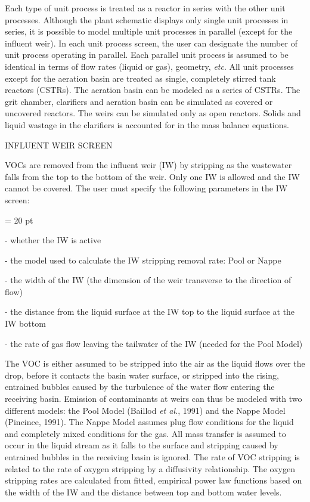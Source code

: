 Each type of unit process is treated as a reactor in series with the other unit
processes.  Although the plant schematic displays only single unit processes in
series, it is possible to model multiple unit processes in parallel (except for
the influent weir).  In each unit process screen, the user can designate the
number of unit process operating in parallel.  Each parallel unit process is
assumed to be identical in terms of flow rates (liquid or gas),  geometry, {\it
etc}. All unit processes except for the aeration basin are treated as single,
completely stirred tank reactors (CSTRs).  The aeration basin can be modeled as
a series of CSTRs. The grit chamber, clarifiers and aeration basin can be
simulated as covered or uncovered reactors.  The weirs can be simulated only as
open reactors.  Solids and liquid wastage in the clarifiers is accounted for in
the mass balance equations. 

 




\newpage

INFLUENT WEIR SCREEN

VOCs are removed from the influent weir (IW) by stripping as the wastewater
falls from the top to the bottom of the weir.  Only one IW is allowed and the
IW cannot be covered.  The user must specify the following parameters in the IW
screen:

{\parindent = 20 pt

\item{-} whether the IW is active 

\item{-} the model used to calculate the IW stripping removal rate: Pool or
Nappe

\item{-} the width of the IW (the dimension of the weir transverse to the
direction of flow)

\item{-} the distance from the liquid surface at the IW top to the liquid
surface at the IW bottom 

\item{-} the rate of gas flow leaving the tailwater of the IW (needed for the
Pool Model)

}

The VOC is either assumed to be stripped into the air as the liquid flows over
the drop, before it contacts the basin water surface, or stripped into the
rising, entrained bubbles caused by the turbulence of the water flow entering
the receiving basin.  Emission of contaminants at weirs can thus be modeled
with two different models: the Pool Model (Baillod  {\it et al.}, 1991) and the
Nappe Model (Pincince, 1991).  The Nappe Model assumes plug flow conditions for
the liquid and completely mixed conditions for the gas.   All mass transfer is
assumed to occur in the liquid stream as it falls to the surface and stripping
caused by entrained bubbles in the receiving basin is ignored.  The rate of VOC
stripping is related to the rate of oxygen stripping by a diffusivity
relationship.  The oxygen stripping rates are calculated from fitted, empirical
power law functions based on the width of the IW and the distance between top
and bottom water levels.

